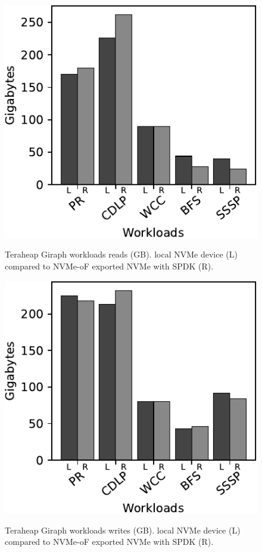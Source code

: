 \vspace{10em}
\begin{figure}[H]
  \includegraphics[width=\linewidth]{figures/giraph_r.pdf}\\
\caption{Teraheap Giraph workloads reads (GB). local NVMe device (L) compared to NVMe-oF exported NVMe with SPDK (R).}
\label{fig:giraph_r}
\end{figure}

\begin{figure}[H]
  \includegraphics[width=\linewidth]{figures/giraph_w.pdf}\\
\caption{Teraheap Giraph workloads writes (GB). local NVMe device (L) compared to NVMe-oF exported NVMe with SPDK (R).}
\label{fig:giraph_w}
\end{figure}
